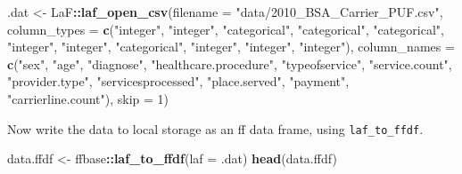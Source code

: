 \documentclass[]{book}
\newenvironment{Shaded}{\begin{snugshade}}{\end{snugshade}}
\newcommand{\DataTypeTok}[1]{\textcolor[rgb]{0.13,0.29,0.53}{#1}}
\newcommand{\DecValTok}[1]{\textcolor[rgb]{0.00,0.00,0.81}{#1}}
\newcommand{\KeywordTok}[1]{\textcolor[rgb]{0.13,0.29,0.53}{\textbf{#1}}}
\newcommand{\NormalTok}[1]{#1}
\newcommand{\OperatorTok}[1]{\textcolor[rgb]{0.81,0.36,0.00}{\textbf{#1}}}
\newcommand{\StringTok}[1]{\textcolor[rgb]{0.31,0.60,0.02}{#1}}
\theoremstyle{definition}
\theoremstyle{definition}
\theoremstyle{definition}
\theoremstyle{remark}
\begin{document}
\begin{Shaded}
\begin{Highlighting}[]
\NormalTok{.dat <-}\StringTok{ }\NormalTok{LaF}\OperatorTok{::}\KeywordTok{laf_open_csv}\NormalTok{(}\DataTypeTok{filename =} \StringTok{"data/2010_BSA_Carrier_PUF.csv"}\NormalTok{,}
                    \DataTypeTok{column_types =} \KeywordTok{c}\NormalTok{(}\StringTok{"integer"}\NormalTok{, }\StringTok{"integer"}\NormalTok{, }\StringTok{"categorical"}\NormalTok{, }\StringTok{"categorical"}\NormalTok{, }\StringTok{"categorical"}\NormalTok{, }\StringTok{"integer"}\NormalTok{, }\StringTok{"integer"}\NormalTok{, }\StringTok{"categorical"}\NormalTok{, }\StringTok{"integer"}\NormalTok{, }\StringTok{"integer"}\NormalTok{, }\StringTok{"integer"}\NormalTok{), }
                    \DataTypeTok{column_names =} \KeywordTok{c}\NormalTok{(}\StringTok{"sex"}\NormalTok{, }\StringTok{"age"}\NormalTok{, }\StringTok{"diagnose"}\NormalTok{, }\StringTok{"healthcare.procedure"}\NormalTok{, }\StringTok{"typeofservice"}\NormalTok{, }\StringTok{"service.count"}\NormalTok{, }\StringTok{"provider.type"}\NormalTok{, }\StringTok{"servicesprocessed"}\NormalTok{, }\StringTok{"place.served"}\NormalTok{, }\StringTok{"payment"}\NormalTok{, }\StringTok{"carrierline.count"}\NormalTok{), }
                    \DataTypeTok{skip =} \DecValTok{1}\NormalTok{)}
\end{Highlighting}
\end{Shaded}

Now write the data to local storage as an ff data frame, using \texttt{laf\_to\_ffdf}.

\begin{Shaded}
\begin{Highlighting}[]
\NormalTok{data.ffdf <-}\StringTok{ }\NormalTok{ffbase}\OperatorTok{::}\KeywordTok{laf_to_ffdf}\NormalTok{(}\DataTypeTok{laf =}\NormalTok{ .dat)}
\KeywordTok{head}\NormalTok{(data.ffdf)}
\end{Highlighting}
\end{Shaded}
\end{document}

